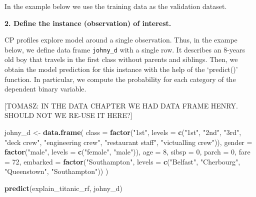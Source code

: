 \documentclass[12pt,]{krantz}
\newenvironment{Shaded}{\begin{snugshade}}{\end{snugshade}}
\newcommand{\DataTypeTok}[1]{\textcolor[rgb]{0.13,0.29,0.53}{#1}}
\newcommand{\DecValTok}[1]{\textcolor[rgb]{0.00,0.00,0.81}{#1}}
\newcommand{\KeywordTok}[1]{\textcolor[rgb]{0.13,0.29,0.53}{\textbf{#1}}}
\newcommand{\NormalTok}[1]{#1}
\newcommand{\OperatorTok}[1]{\textcolor[rgb]{0.81,0.36,0.00}{\textbf{#1}}}
\newcommand{\StringTok}[1]{\textcolor[rgb]{0.31,0.60,0.02}{#1}}
\theoremstyle{definition}
\theoremstyle{definition}
\theoremstyle{definition}
\theoremstyle{remark}
\begin{document}
In the example below we use the training data as the validation dataset.

\begin{Shaded}
\end{Shaded}

\textbf{2. Define the instance (observation) of interest.}

CP profiles explore model around a single observation. Thus, in the
exampe below, we define data frame \texttt{johny\_d} with a single row.
It describes an 8-years old boy that travels in the first class without
parents and siblings. Then, we obtain the model prediction for this
instance with the help of the `predict()' function. In particular, we
compute the probability for each category of the dependent binary
variable.

{[}TOMASZ: IN THE DATA CHAPTER WE HAD DATA FRAME HENRY. SHOULD NOT WE
RE-USE IT HERE?{]}

\begin{Shaded}
\begin{Highlighting}[]
\NormalTok{johny_d <-}\StringTok{ }\KeywordTok{data.frame}\NormalTok{(}
  \DataTypeTok{class =} \KeywordTok{factor}\NormalTok{(}\StringTok{"1st"}\NormalTok{, }\DataTypeTok{levels =} \KeywordTok{c}\NormalTok{(}\StringTok{"1st"}\NormalTok{, }\StringTok{"2nd"}\NormalTok{, }\StringTok{"3rd"}\NormalTok{, }\StringTok{"deck crew"}\NormalTok{, }\StringTok{"engineering crew"}\NormalTok{, }
                                  \StringTok{"restaurant staff"}\NormalTok{, }\StringTok{"victualling crew"}\NormalTok{)),}
  \DataTypeTok{gender =} \KeywordTok{factor}\NormalTok{(}\StringTok{"male"}\NormalTok{, }\DataTypeTok{levels =} \KeywordTok{c}\NormalTok{(}\StringTok{"female"}\NormalTok{, }\StringTok{"male"}\NormalTok{)),}
  \DataTypeTok{age =} \DecValTok{8}\NormalTok{,}
  \DataTypeTok{sibsp =} \DecValTok{0}\NormalTok{,}
  \DataTypeTok{parch =} \DecValTok{0}\NormalTok{,}
  \DataTypeTok{fare =} \DecValTok{72}\NormalTok{,}
  \DataTypeTok{embarked =} \KeywordTok{factor}\NormalTok{(}\StringTok{"Southampton"}\NormalTok{, }\DataTypeTok{levels =} \KeywordTok{c}\NormalTok{(}\StringTok{"Belfast"}\NormalTok{, }\StringTok{"Cherbourg"}\NormalTok{, }\StringTok{"Queenstown"}\NormalTok{, }\StringTok{"Southampton"}\NormalTok{))}
\NormalTok{)}

\KeywordTok{predict}\NormalTok{(explain_titanic_rf, johny_d)}
\end{Highlighting}
\end{Shaded}
\end{document}
